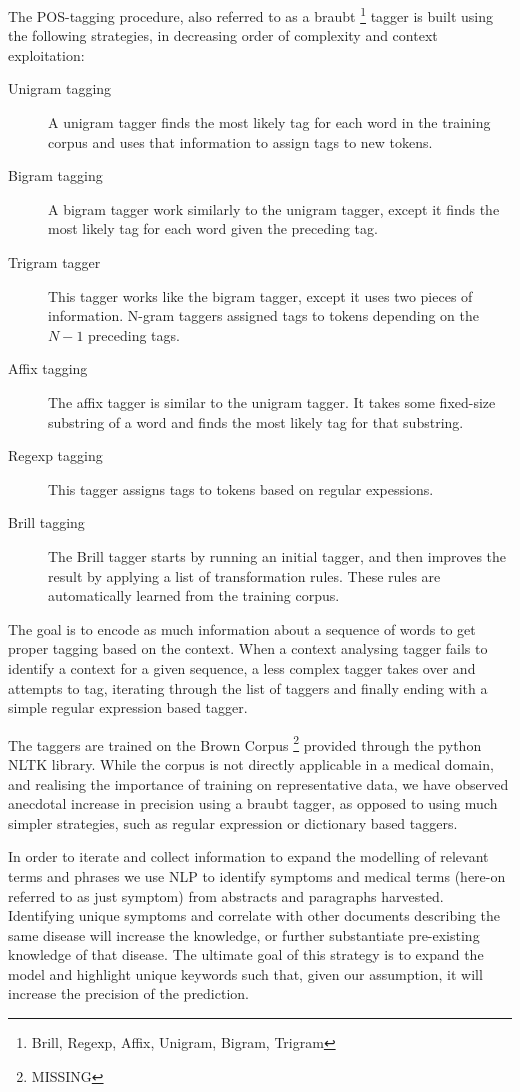 \documentclass[10pt,letterpaper,final]{article}
\begin{document}
The POS-tagging procedure, also referred to as a
braubt \cite{} \footnote{Brill, Regexp, Affix, Unigram, Bigram, Trigram}
tagger is built using the following strategies, in decreasing order of
complexity and context exploitation:
\begin{description}
\item[Unigram tagging] A unigram tagger finds the most likely tag for each word
in the training corpus and uses that information to assign tags to new
tokens.
\item[Bigram tagging] A bigram tagger work similarly to the unigram
tagger, except it finds the most likely tag for each word given the
preceding tag.
\item[Trigram tagger] This tagger works like the bigram tagger, except it
uses two pieces of information. N-gram taggers assigned tags to tokens
depending on the $N - 1$ preceding tags.
\item[Affix tagging] The affix tagger is similar to the unigram tagger.
It takes some fixed-size substring of a word and finds the most likely
tag for that substring.
\item[Regexp tagging] This tagger assigns tags to tokens based on regular
expessions.
\item[Brill tagging] The Brill\cite{Brill:1992:SRP:974499.974526} tagger
starts by running an initial tagger, and then improves the result by
applying a list of transformation rules. These rules are automatically
learned from the training corpus.
 \end{description}
The goal is to encode as much information about a sequence of words to
get proper tagging based on the context. When a context analysing tagger
fails to identify a context for a given sequence, a less complex tagger
takes over and attempts to tag, iterating through the list of taggers
and finally ending with a simple regular expression based tagger.

The taggers are trained on the Brown Corpus \footnote{MISSING} provided
through the python NLTK library. While the corpus is not directly
applicable in a medical domain, and realising the importance of training
on representative data, we have observed anecdotal increase in precision
using a braubt tagger, as opposed to using much simpler strategies, such
as regular expression or dictionary based taggers.


In order to iterate and collect information to expand the modelling of
relevant terms and phrases we use NLP to identify symptoms and medical
terms (here-on referred to as just symptom) from abstracts and
paragraphs harvested. Identifying unique symptoms and correlate with
other documents describing the same disease will increase the knowledge,
or further substantiate pre-existing knowledge of that disease. The
ultimate goal of this strategy is to expand the model and highlight
unique keywords such that, given our assumption, it will increase the
precision of the prediction.
\end{document}
